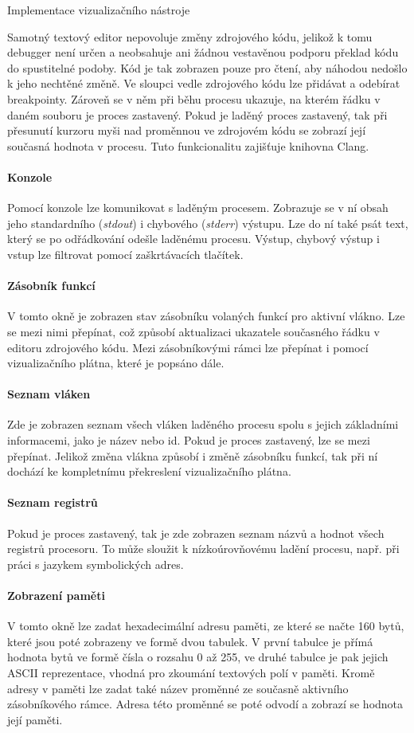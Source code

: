 \documentclass[czech,bachelor,male,python,dept460,hidelinks]{diploma}						%
\newcommand{\parspace}[1][]{
	\ifthenelse{\isempty{#1}}{\vspace{5mm}}{\vspace{#1}}
	\par
}
\begin{document}
\begin{section}{Implementace vizualizačního nástroje}
		\parspace Samotný textový editor nepovoluje změny zdrojového kódu, jelikož k tomu debugger není určen a neobsahuje ani žádnou vestavěnou podporu překlad
		kódu do spustitelné podoby. Kód je tak zobrazen pouze pro čtení, aby náhodou nedošlo k jeho nechtěné změně. Ve sloupci vedle zdrojového kódu lze přidávat
		a odebírat breakpointy. Zároveň se v něm při běhu procesu ukazuje, na kterém řádku v daném souboru je proces zastavený. Pokud je laděný proces zastavený,
		tak při přesunutí kurzoru myši nad proměnnou ve zdrojovém kódu se zobrazí její současná hodnota v procesu. Tuto funkcionalitu zajišťuje knihovna Clang.
	\paragraph*{Konzole} Pomocí konzole lze komunikovat s laděným procesem. Zobrazuje se v ní obsah jeho standardního (\textit{stdout}) i chybového (\textit{stderr})
		výstupu. Lze do ní také psát text, který se po odřádkování odešle laděnému procesu. Výstup, chybový výstup i vstup lze filtrovat pomocí
		zaškrtávacích tlačítek.
	\paragraph*{Zásobník funkcí} V tomto okně je zobrazen stav zásobníku volaných funkcí pro aktivní vlákno. Lze se mezi nimi přepínat, což způsobí aktualizaci
		ukazatele současného řádku v editoru zdrojového kódu. Mezi zásobníkovými rámci lze přepínat i pomocí vizualizačního plátna, které je popsáno dále.
	\paragraph*{Seznam vláken} Zde je zobrazen seznam všech vláken laděného procesu spolu s jejich základními informacemi, jako je název nebo id. Pokud je proces
		zastavený, lze se mezi přepínat. Jelikož změna vlákna způsobí i změně zásobníku funkcí, tak při ní dochází ke kompletnímu překreslení vizualizačního
		plátna.
	\paragraph*{Seznam registrů}
		Pokud je proces zastavený, tak je zde zobrazen seznam názvů a hodnot všech registrů procesoru. To může sloužit k nízkoúrovňovému ladění procesu, např.
		při práci s jazykem symbolických adres.
	\paragraph*{Zobrazení paměti} V tomto okně lze zadat hexadecimální adresu paměti, ze které se načte 160 bytů, které jsou poté zobrazeny ve formě dvou tabulek.
		V první tabulce je přímá hodnota bytů ve formě čísla o rozsahu 0 až 255, ve druhé tabulce je pak jejich ASCII reprezentace, vhodná pro zkoumání textových
		polí v paměti. Kromě adresy v paměti lze zadat také název proměnné ze současně aktivního zásobníkového rámce. Adresa této proměnné se poté odvodí
		a zobrazí se hodnota její paměti.

\end{section}
\end{document}
